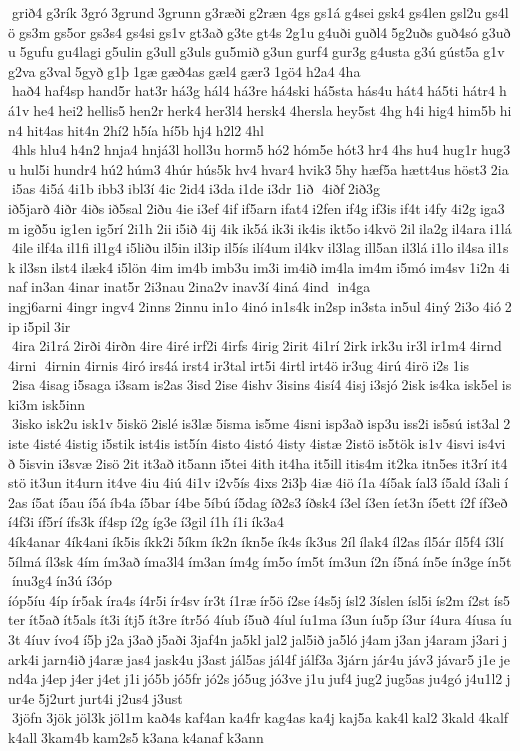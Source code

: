  grið4 g3rík 3gró 3grund 3grunn g3ræði g2ræn 4gs gs1á g4sei gsk4 gs4len gsl2u gs4lö gs3m gs5or gs3s4 gs4si gs1v gt3að g3te gt4s 2g1u g4uði guðl4 5g2uðs guð4só g3uðu 5gufu gu4lagi g5ulin g3ull g3uls gu5mið g3un gurf4 gur3g g4usta g3ú gúst5a g1v g2va g3val 5gyð g1þ 1gæ gæð4as gæl4 gær3 1gö4 h2a4 4ha  hað4 haf4sp hand5r hat3r há3g hál4 há3re há4ski há5sta hás4u hát4 há5ti hátr4 há1v he4 hei2 hellis5 hen2r herk4 her3l4 hersk4 4hersla hey5st 4hg h4i hig4 him5b hin4 hit4as hit4n 2hí2 h5ía hí5b hj4 h2l2 4hl  4hls hlu4 h4n2 hnja4 hnjá3l holl3u horm5 hó2 hóm5e hót3 hr4 4hs hu4 hug1r hug3u hul5i hundr4 hú2 húm3 4húr hús5k hv4 hvar4 hvik3 5hy hæf5a hætt4us höst3 2ia i5as 4i5á 4i1b ibb3 ibl3í 4ic 2id4 i3da i1de i3dr 1ið  4iðf 2ið3g 	ið5jarð 4iðr 4iðs ið5sal 2iðu 4ie i3ef 4if if5arn ifat4 i2fen if4g if3is if4t i4fy 4i2g iga3m igð5u ig1en ig5rí 2i1h 2ii i5ið 4ij 4ik ik5á ik3i ik4is ikt5o i4kvö 2il ila2g il4ara i1lá 4ile ilf4a il1fi il1g4 i5liðu il5in il3ip il5ís ilí4um il4kv il3lag ill5an il3lá i1lo il4sa il1sk il3sn ilst4 ilæk4 i5lön 4im im4b imb3u im3i im4ið im4la im4m i5mó im4sv 1i2n 4inaf in3an 4inar inat5r 2i3nau 2ina2v inav3í 4iná 4ind  in4ga 	ingj6arni 4ingr ingv4 2inns 2innu in1o 4inó in1s4k in2sp in3sta in5ul 4iný 2i3o 4ió 2ip i5pil 3ir  4ira 2i1rá 2irði 4irðn 4ire 4iré irf2i 4irfs 4irig 2irit 4i1rí 2irk irk3u ir3l ir1m4 4irnd 4irni  4irnin 4irnis 4iró irs4á irst4 ir3tal irt5i 4irtl irt4ö ir3ug 4irú 4irö i2s 1is  2isa 4isag i5saga i3sam is2as 3isd 2ise 4ishv 3isins 4isí4 4isj i3sjó 2isk is4ka isk5el iski3m isk5inn  3isko isk2u isk1v 5iskö 2islé is3læ 5isma is5me 4isni isp3að isp3u iss2i is5sú ist3al 2iste 4isté 4istig i5stik ist4is ist5ín 4isto 4istó 4isty 4istæ 2istö is5tök is1v 4isvi is4við 5isvin i3svæ 2isö 2it it3að it5ann i5tei 4ith it4ha it5ill itis4m it2ka itn5es it3rí it4stö it3un it4urn it4ve 4iu 4iú 4i1v i2v5ís 4ixs 2i3þ 4iæ 4iö í1a 4í5ak íal3 í5ald í3ali í2as í5at í5au í5á íb4a í5bar í4be 5íbú í5dag íð2s3 íðsk4 í3el í3en íet3n í5ett í2f íf3eð í4f3i íf5rí ífs3k íf4sp í2g íg3e í3gil í1h í1i ík3a4 	4ík4anar 4ík4ani ík5is íkk2i 5íkm ík2n íkn5e ík4s ík3us 2íl ílak4 íl2as íl5ár íl5f4 í3lí 5ílmá íl3sk 4ím ím3að íma3l4 ím3an ím4g ím5o ím5t ím3un í2n í5ná ín5e ín3ge ín5t ínu3g4 ín3ú í3óp 	íóp5íu 4íp ír5ak íra4s í4r5i ír4sv ír3t í1ræ ír5ö í2se í4s5j ísl2 3íslen ísl5i ís2m í2st ís5ter ít5að ít5als ít3i ítj5 ít3re ítr5ó 4íub í5uð 4íul íu1ma í3un íu5p í3ur í4ura 4íusa íu3t 4íuv ívo4 í5þ j2a j3að j5aði 3jaf4n ja5kl jal2 jal5ið ja5ló j4am j3an j4aram j3ari jark4i jarn4ið j4aræ jas4 jask4u j3ast jál5as jál4f jálf3a 3járn jár4u jáv3 jávar5 j1e jend4a j4ep j4er j4et j1i jó5b jó5fr jó2s jó5ug jó3ve j1u juf4 jug2 jug5as ju4gó j4u1l2 jur4e 5j2urt jurt4i j2us4 j3ust  3jöfn 3jök jöl3k jöl1m kað4s kaf4an ka4fr kag4as ka4j kaj5a kak4l kal2 3kald 4kalf k4all 3kam4b kam2s5 k3ana k4anaf k3ann 